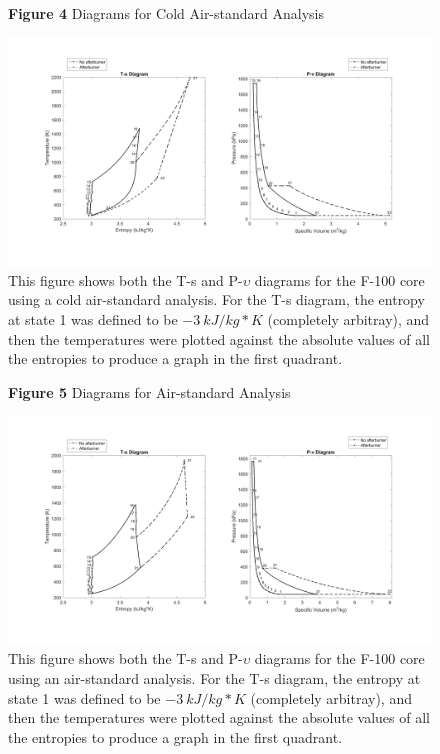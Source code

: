 \documentclass[11pt]{article} %
\begin{document}
\begin{figure}[!h]
  \centering
  \textbf{Figure 4} Diagrams for Cold Air-standard Analysis\par\medskip
  \includegraphics[scale=0.48]{cold_air_diagrams.png}
  \caption{This figure shows both the T-s and P-$\upsilon$ diagrams for the F-100 core using a cold air-standard analysis. For the T-s diagram, the entropy at state 1 was defined to be $-3 \ \si{kJ/kg*K}$ (completely arbitray), and then the temperatures were plotted against the absolute values of all the entropies to produce a graph in the first quadrant.}
  \label{fig:cold_air_diagrams}
\end{figure}

\begin{figure}[!h]
  \centering
  \textbf{Figure 5} Diagrams for Air-standard Analysis\par\medskip
  \includegraphics[scale=0.48]{regular_air_diagrams.png}
  \caption{This figure shows both the T-s and P-$\upsilon$ diagrams for the F-100 core using an air-standard analysis. For the T-s diagram, the entropy at state 1 was defined to be $-3 \ \si{kJ/kg*K}$ (completely arbitray), and then the temperatures were plotted against the absolute values of all the entropies to produce a graph in the first quadrant.}
  \label{fig:regular_air_diagrams}
\end{figure}
\end{document}
